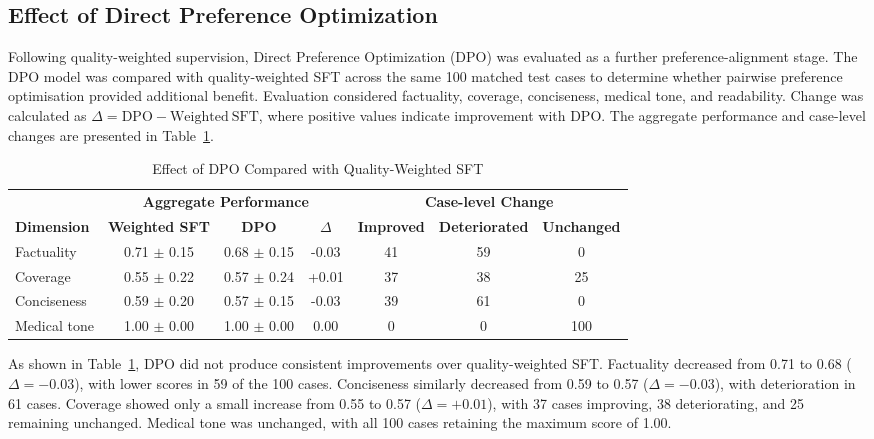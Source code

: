 \documentclass[ %
                    author={Aman Kumar Singh},
                supervisor={Dr. Edwin Simpson},
                    degree={MSc},
                     title={Quality-Aware Knowledge Distillation of Large Language Models for Efficient Personalised Clinical Report Generation},
                  subtitle={},
                      type={},
                      year={2021}]{dissertation}
\begin{document}
\subsection{Effect of Direct Preference Optimization}
\label{sec:effect_dpo}

Following quality-weighted supervision, Direct Preference Optimization
(DPO) was evaluated as a further preference-alignment stage. The DPO
model was compared with quality-weighted SFT across the same 100 matched
test cases to determine whether pairwise preference optimisation
provided additional benefit. Evaluation considered factuality, coverage,
conciseness, medical tone, and readability. Change was calculated as
$\Delta = \mathrm{DPO} - \mathrm{Weighted\ SFT}$, where positive values
indicate improvement with DPO. The aggregate performance and case-level
changes are presented in Table~\ref{tab:weighted_dpo_comparison}.
\vspace{-15pt}

\begin{table}[htbp]
\centering
\footnotesize
\caption{Effect of DPO Compared with Quality-Weighted SFT}
\label{tab:weighted_dpo_comparison}
\begin{tabular}{lccc|ccc}
\hline
& \multicolumn{3}{c|}{\textbf{Aggregate Performance}}
& \multicolumn{3}{c}{\textbf{Case-level Change}} \\
\cline{2-7}
\textbf{Dimension}
& \textbf{Weighted SFT}
& \textbf{DPO}
& \textbf{$\Delta$}
& \textbf{Improved}
& \textbf{Deteriorated}
& \textbf{Unchanged} \\
\hline

Factuality
& 0.71 $\pm$ 0.15
& 0.68 $\pm$ 0.15
& -0.03
& 41
& 59
& 0 \\

Coverage
& 0.55 $\pm$ 0.22
& 0.57 $\pm$ 0.24
& +0.01
& 37
& 38
& 25 \\

Conciseness
& 0.59 $\pm$ 0.20
& 0.57 $\pm$ 0.15
& -0.03
& 39
& 61
& 0 \\

Medical tone
& 1.00 $\pm$ 0.00
& 1.00 $\pm$ 0.00
& 0.00
& 0
& 0
& 100 \\

\hline
\end{tabular}
\end{table}

As shown in Table~\ref{tab:weighted_dpo_comparison}, DPO did not produce
consistent improvements over quality-weighted SFT. Factuality decreased
from 0.71 to 0.68 ($\Delta=-0.03$), with lower scores in 59 of the
100 cases. Conciseness similarly decreased from 0.59 to 0.57
($\Delta=-0.03$), with deterioration in 61 cases. Coverage showed only
a small increase from 0.55 to 0.57 ($\Delta=+0.01$), with 37 cases
improving, 38 deteriorating, and 25 remaining unchanged. Medical tone
was unchanged, with all 100 cases retaining the maximum score of 1.00.
\end{document}

